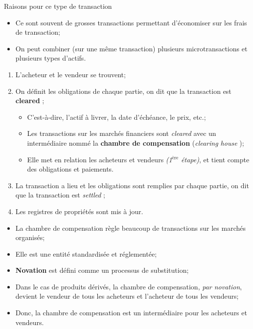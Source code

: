 \documentclass[10pt, french]{article}
\begin{document}
\begin{multicols*}{2}
\begin{definitionNOHFILL}
\begin{conceptgen}{Raisons pour ce type de transaction}
\begin{itemize}[leftmargin = *]
	\item Ce sont souvent de grosses transactions permettant d'économiser sur les frais de transaction;
	\item On peut combiner (sur une même transaction) plusieurs microtransactions et plusieurs types d'actifs.
\end{itemize}
\end{conceptgen}
\end{definitionNOHFILL}

\begin{algo2}
\begin{enumerate}
	\item 	L'acheteur et le vendeur se trouvent;
	\item 	On définit les obligations de chaque partie, on dit que la transaction est \og \textbf{cleared} \fg{};
		\begin{itemize}[leftmargin = *]
		\item	C'est-à-dire, l'actif à livrer, la date d'échéance, le prix, etc.;
		\item	Les transactions sur les marchés financiers sont \textit{cleared} avec un intermédiaire nommé la \textbf{chambre de compensation} (\og \textit{clearing house} \fg{});
		\item	Elle met en relation les acheteurs et vendeurs \textit{(1$^{\text{ère}}$ étape)}, et tient compte des obligations et paiements.
		\end{itemize}	
	\item 	La transaction a lieu et les obligations sont remplies par chaque partie, on dit que la transaction est \og \textit{settled} \fg{};
	\item 	Les registres de propriétés sont mis à jour.
\end{enumerate}	
\end{algo2}

\begin{definitionNOHFILL}
\begin{itemize}
	\item	La chambre de compensation règle beaucoup de transactions sur les marchés organisés;
	\item	Elle est une entité standardisée et réglementée;
	\item	\textbf{Novation} est défini comme un processus de substitution;
	\item	Dans le cas de produits dérivés, la chambre de compensation, \textit{par novation}, devient le vendeur de tous les acheteurs et l'acheteur de tous les vendeurs;
	\item	Donc, la chambre de compensation est un intermédiaire pour les acheteurs et vendeurs. 
\end{itemize}
\end{definitionNOHFILL}


\end{multicols*}
\end{document}
